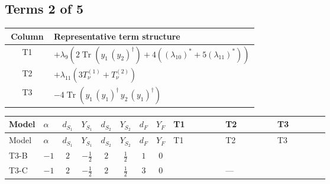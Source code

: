 \documentclass[8pt]{article}
\begin{document}
\begin{landscape}
\subsection*{Terms 2 of 5}
\begin{center}
\begin{tabular}{@{}c >{\raggedright\arraybackslash}p{0.82\linewidth}@{}}
\toprule
Column & Representative term structure \\
\midrule
T1 & \(\displaystyle +{\lambda_9} (2 \operatorname{Tr}\!\left({y_1}\,\left({y_2}\right)^{\dagger}\right)+4 (\left({\lambda_{10}}\right)^{*}+5 \left({\lambda_{11}}\right)^{*}))\) \\
\midrule
T2 & \(\displaystyle +{\lambda_{11}} (3 T_{\nu}^{(1)}+T_{\nu}^{(2)})\) \\
\midrule
T3 & \(\displaystyle -4 \operatorname{Tr}\!\left({y_1}\,\left({y_1}\right)^{\dagger}\,{y_2}\,\left({y_1}\right)^{\dagger}\right)\) \\
\midrule
\bottomrule
\end{tabular}
\end{center}
\smallskip
\tiny
\begin{longtable}{@{}llcccccc >{\raggedright\arraybackslash}p{0.21\linewidth} >{\raggedright\arraybackslash}p{0.21\linewidth} >{\raggedright\arraybackslash}p{0.21\linewidth}@{}}
\toprule
Model & $\alpha$ & $d_{S_1}$ & $Y_{S_1}$ & $d_{S_2}$ & $Y_{S_2}$ & $d_F$ & $Y_F$ & T1 & T2 & T3 \\
\midrule
\endfirsthead
\toprule
Model & $\alpha$ & $d_{S_1}$ & $Y_{S_1}$ & $d_{S_2}$ & $Y_{S_2}$ & $d_F$ & $Y_F$ & T1 & T2 & T3 \\
\midrule
\endhead
T3-B & $-1$ & $2$ & $-\frac{1}{2}$ & $2$ & $\frac{1}{2}$ & $1$ & $0$ & \scriptsize\adjustbox{max width=\linewidth}{$\begin{gathered} +{\lambda_9} (2 \operatorname{Tr}\!\left({y_1}\,\left({y_2}\right)^{\dagger}\right)+4 (\left({\lambda_{10}}\right)^{*}+5 \left({\lambda_{11}}\right)^{*}))\end{gathered}$} & \scriptsize\adjustbox{max width=\linewidth}{$\begin{gathered} +{\lambda_{11}} (3 T_{\nu}^{(1)}+T_{\nu}^{(2)})\end{gathered}$} & \scriptsize\adjustbox{max width=\linewidth}{$\begin{gathered} -4 \operatorname{Tr}\!\left({y_1}\,\left({y_1}\right)^{\dagger}\,{y_2}\,\left({y_1}\right)^{\dagger}\right)\end{gathered}$} \\
\midrule
T3-C & $-1$ & $2$ & $-\frac{1}{2}$ & $2$ & $\frac{1}{2}$ & $3$ & $0$ & \scriptsize\adjustbox{max width=\linewidth}{$\begin{gathered} +{\lambda_9} (3 \operatorname{Tr}\!\left({y_1}\,\left({y_2}\right)^{\dagger}\right)+4 (\left({\lambda_{10}}\right)^{*}+5 \left({\lambda_{11}}\right)^{*}))\end{gathered}$} & --- & \scriptsize\adjustbox{max width=\linewidth}{$\begin{gathered} -5 \operatorname{Tr}\!\left({y_1}\,\left({y_1}\right)^{\dagger}\,{y_2}\,\left({y_1}\right)^{\dagger}\right)\end{gathered}$} \\

\end{longtable}
\end{landscape}
\end{document}
